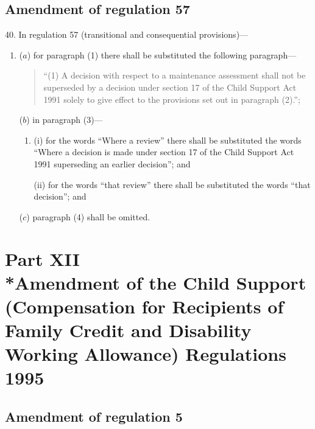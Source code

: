 \documentclass[12pt,a4paper]{article}
\begin{document}
\subsection[40. Amendment of regulation 57]{Amendment of regulation 57}

40.  In regulation 57 (transitional and consequential provisions)—
\begin{enumerate}\item[]
($a$) for paragraph (1) there shall be substituted the following paragraph—
\begin{quotation}
“(1) A decision with respect to a maintenance assessment shall not be superseded by a decision under section 17 of the Child Support Act 1991 solely to give effect to the provisions set out in paragraph (2).”;
\end{quotation}

($b$) in paragraph (3)—
\begin{enumerate}\item[]
(i) for the words “Where a review” there shall be substituted the words “Where a decision is made under section 17 of the Child Support Act 1991 superseding an earlier decision”; and

(ii) for the words “that review” there shall be substituted the words “that decision”; and
\end{enumerate}

($c$) paragraph (4) shall be omitted.
\end{enumerate}

\section[Part XII --- Amendment of the Child Support (Compensation for Recipients of Family Credit and Disability Working Allowance) Regulations 1995]{\sloppy Part XII\\*Amendment of the Child Support (Compensation for Recipients of Family Credit and Disability Working Allowance) Regulations 1995}

\renewcommand\parthead{--- Part XII}

\subsection[41. Amendment of regulation 5]{Amendment of regulation 5}
\end{document}
